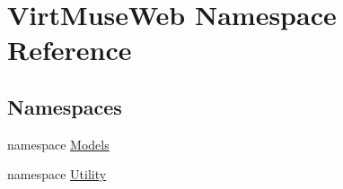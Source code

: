 \hypertarget{namespace_virt_muse_web}{}\section{Virt\+Muse\+Web Namespace Reference}
\label{namespace_virt_muse_web}
\subsection*{Namespaces}
\begin{DoxyCompactItemize}
\item 
namespace \mbox{\hyperlink{namespace_virt_muse_web_1_1_models}{Models}}
\item 
namespace \mbox{\hyperlink{namespace_virt_muse_web_1_1_utility}{Utility}}
\end{DoxyCompactItemize}

